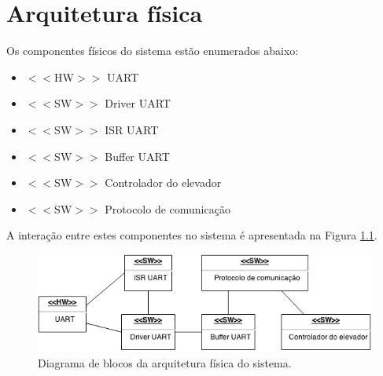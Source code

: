 \chapter{Arquitetura física}

Os componentes físicos do sistema estão enumerados abaixo:

\begin{itemize}
	\item $<<$HW$>>$ UART
	\item $<<$SW$>>$ Driver UART
	\item $<<$SW$>>$ ISR UART
	\item $<<$SW$>>$ Buffer UART
	\item $<<$SW$>>$ Controlador do elevador
	\item $<<$SW$>>$ Protocolo de comunicação
\end{itemize}

A interação entre estes componentes no sistema é apresentada na Figura \ref{fig:arq_fisica}.

\begin{figure}[h]
    \centering
    \includegraphics[width=0.8\columnwidth]{./figures/arq_fisica.png}
    \caption{Diagrama de blocos da arquitetura física do sistema.}
    \label{fig:arq_fisica}
\end{figure}

